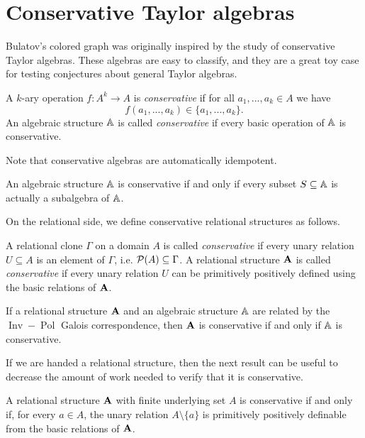 \documentclass[letterpaper,11pt]{article}
\DeclareMathOperator{\Pol}{Pol}
\DeclareMathOperator{\Inv}{Inv}
\begin{document}


\section{Conservative Taylor algebras}

Bulatov's colored graph was originally inspired by the study of conservative Taylor algebras. These algebras are easy to classify, and they are a great toy case for testing conjectures about general Taylor algebras.

\begin{defn} A $k$-ary operation $f : A^k \rightarrow A$ is \emph{conservative} if for all $a_1, ..., a_k \in A$ we have
\[
f(a_1, ..., a_k) \in \{a_1, ..., a_k\}.
\]
An algebraic structure $\mathbb{A}$ is called \emph{conservative} if every basic operation of $\mathbb{A}$ is conservative.
\end{defn}

Note that conservative algebras are automatically idempotent.

\begin{prop} An algebraic structure $\mathbb{A}$ is conservative if and only if every subset $S \subseteq \mathbb{A}$ is actually a subalgebra of $\mathbb{A}$.
\end{prop}

On the relational side, we define conservative relational structures as follows.

\begin{defn} A relational clone $\Gamma$ on a domain $A$ is called \emph{conservative} if every unary relation $U \subseteq A$ is an element of $\Gamma$, i.e. $\mathcal{P}(A) \subseteq \Gamma$. A relational structure $\mathbf{A}$ is called \emph{conservative} if every unary relation $U$ can be primitively positively defined using the basic relations of $\mathbf{A}$.
\end{defn}

\begin{prop} If a relational structure $\mathbf{A}$ and an algebraic structure $\mathbb{A}$ are related by the $\Inv-\Pol$ Galois correspondence, then $\mathbf{A}$ is conservative if and only if $\mathbb{A}$ is conservative.
\end{prop}

If we are handed a relational structure, then the next result can be useful to decrease the amount of work needed to verify that it is conservative.

\begin{prop} A relational structure $\mathbf{A}$ with finite underlying set $A$ is conservative if and only if, for every $a \in A$, the unary relation $A \setminus \{a\}$ is primitively positively definable from the basic relations of $\mathbf{A}$.
\end{prop}
\end{document}
